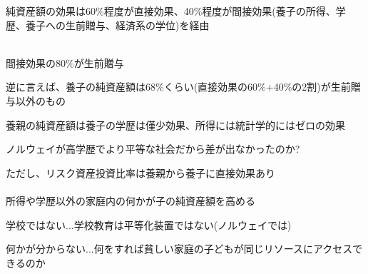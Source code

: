 \begin{frame}[t]{}
純資産額の効果は60\%程度が直接効果、40\%程度が間接効果(養子の所得、学歴、養子への生前贈与、経済系の学位)を経由\\~\\
\begin{dinglist}{43}
\vspace{1.0ex}\setlength{\itemsep}{1.0ex}\setlength{\baselineskip}{12pt}
\pause
\item	間接効果の80\%が生前贈与
\pause
\item	逆に言えば、養子の純資産額は68\%くらい(直接効果の60\%+40\%の2割)が生前贈与以外のもの
\end{dinglist}

\vspace{2ex}
\pause
養親の純資産額は養子の学歴は僅少効果、所得には統計学的にはゼロの効果
\begin{dinglist}{43}
\vspace{1.0ex}\setlength{\itemsep}{1.0ex}\setlength{\baselineskip}{12pt}
\pause
\item	ノルウェイが高学歴でより平等な社会だから差が出なかったのか?
\end{dinglist}

\vspace{2ex}
\pause
ただし、リスク資産投資比率は養親から養子に直接効果あり\\~\\

\pause
所得や学歴以外の家庭内の何かが子の純資産額を高める
\begin{dinglist}{43}
\vspace{1.0ex}\setlength{\itemsep}{1.0ex}\setlength{\baselineskip}{12pt}
\pause
\item	学校ではない...学校教育は平等化装置ではない(ノルウェイでは)
\pause
\item	何かが分からない...何をすれば貧しい家庭の子どもが同じリソースにアクセスできるのか
\end{dinglist}
\end{frame}

